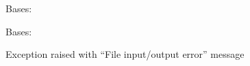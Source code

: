 \documentclass[letterpaper,10pt,english]{sphinxmanual}
\begin{document}
\begin{fulllineitems}
\label{\detokenize{groerrors:groerrors.GromacsError}}
\pysigstartsignatures
{}
\pysigstopsignatures
\sphinxAtStartPar
Bases: 

\end{fulllineitems}


\begin{fulllineitems}
\label{\detokenize{groerrors:groerrors.IOGromacsError}}
\pysigstartsignatures
{}
\pysigstopsignatures
\sphinxAtStartPar
Bases: {\hyperref[\detokenize{groerrors:groerrors.GromacsError}]{}}

\sphinxAtStartPar
Exception raised with “File input/output error” message

\end{fulllineitems}

\end{document}
